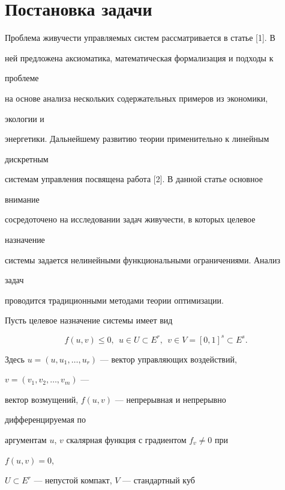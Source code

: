 \section{Постановка задачи}





Проблема живучести управляемых систем рассматривается в статье [1]. В 


ней предложена аксиоматика, математическая формализация и подходы к 


проблеме 


на основе анализа нескольких содержательных примеров из экономики, 


экологии и


энергетики. Дальнейшему развитию теории применительно к линейным 


дискретным


системам управления посвящена работа [2]. В данной статье основное 


внимание


сосредоточено на исследовании задач живучести, в которых целевое 


назначение 


системы задается нелинейными функциональными ограничениями. Анализ 


задач 


проводится традиционными методами теории оптимизации. 





Пусть целевое назначение системы имеет вид


\begin{equation}


f(u,v)\le 0,\ \ u\in U\subset E^r,


\ \ v\in V=[0,1]^s\subset E^s.


\end{equation}


Здесь $u=(u,u_1,\dotsc,u_r)$ --- вектор управляющих воздействий, 


$v=(v_1,v_2,\dotsc,v_m)$ ---


вектор возмущений, $f(u,v)$ --- непрерывная и непрерывно 


дифференцируемая по


аргументам $u$, $v$ скалярная функция с градиентом $f_v\ne0$ при 


$f(u,v)=0$,


$U\subset E^r$ --- непустой компакт, $V$ --- стандартный куб 


